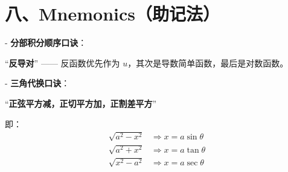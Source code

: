 \documentclass[UTF8]{ctexart}
\begin{document}
	\section*{八、Mnemonics（助记法）}
	
	
	- \textbf{分部积分顺序口诀}：
	\begin{center}
		“\textbf{反导对}” —— 反函数优先作为 $u$，其次是导数简单函数，最后是对数函数。
	\end{center}
	
	- \textbf{三角代换口诀}：
	\begin{center}
		“\textbf{正弦平方减，正切平方加，正割差平方}”
	\end{center}
	即：
	\begin{align*}
		\sqrt{a^2 - x^2} &\Rightarrow x = a\sin\theta \\
		\sqrt{a^2 + x^2} &\Rightarrow x = a\tan\theta \\
		\sqrt{x^2 - a^2} &\Rightarrow x = a\sec\theta
	\end{align*}
	
	
\end{document}
